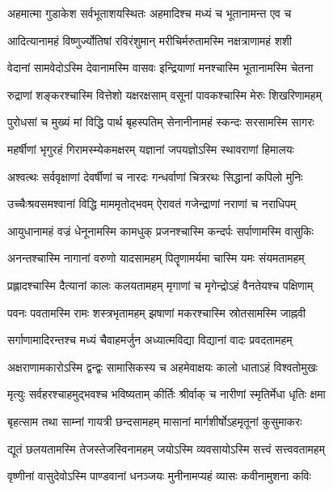 \twolineshloka
{अहमात्मा गुडाकेश सर्वभूताशयस्थितः}
{अहमादिश्च मध्यं च भूतानामन्त एव च}%

\twolineshloka
{आदित्यानामहं विष्णुर्ज्योतिषां रविरंशुमान्}
{मरीचिर्मरुतामस्मि नक्षत्राणामहं शशी}%

\twolineshloka
{वेदानां सामवेदोऽस्मि देवानामस्मि वासवः}
{इन्द्रियाणां मनश्चास्मि भूतानामस्मि चेतना}%

\twolineshloka
{रुद्राणां शङ्करश्चास्मि वित्तेशो यक्षरक्षसाम्}
{वसूनां पावकश्चास्मि मेरुः शिखरिणामहम्}%

\twolineshloka
{पुरोधसां च मुख्यं मां विद्धि पार्थ बृहस्पतिम्}
{सेनानीनामहं स्कन्दः सरसामस्मि सागरः}%

\twolineshloka
{महर्षीणां भृगुरहं गिरामस्म्येकमक्षरम्}
{यज्ञानां जपयज्ञोऽस्मि स्थावराणां हिमालयः}%

\twolineshloka
{अश्वत्थः सर्ववृक्षाणां देवर्षीणां च नारदः}
{गन्धर्वाणां चित्ररथः सिद्धानां कपिलो मुनिः}%

\twolineshloka
{उच्चैःश्रवसमश्वानां विद्धि माममृतोद्भवम्}
{ऐरावतं गजेन्द्राणां नराणां च नराधिपम्}%

\twolineshloka
{आयुधानामहं वज्रं धेनूनामस्मि कामधुक्}
{प्रजनश्चास्मि कन्दर्पः सर्पाणामस्मि वासुकिः}%

\twolineshloka
{अनन्तश्चास्मि नागानां वरुणो यादसामहम्}
{पितॄणामर्यमा चास्मि यमः संयमतामहम्}%

\twolineshloka
{प्रह्लादश्चास्मि दैत्यानां कालः कलयतामहम्}
{मृगाणां च मृगेन्द्रोऽहं वैनतेयश्च पक्षिणाम्}%

\twolineshloka
{पवनः पवतामस्मि रामः शस्त्रभृतामहम्}
{झषाणां मकरश्चास्मि स्रोतसामस्मि जाह्नवी}%

\twolineshloka
{सर्गाणामादिरन्तश्च मध्यं चैवाहमर्जुन}
{अध्यात्मविद्या विद्यानां वादः प्रवदतामहम्}%

\twolineshloka
{अक्षराणामकारोऽस्मि द्वन्द्वः सामासिकस्य च}
{अहमेवाक्षयः कालो धाताऽहं विश्वतोमुखः}%

\twolineshloka
{मृत्युः सर्वहरश्चाहमुद्भवश्च भविष्यताम्}
{कीर्तिः श्रीर्वाक् च नारीणां स्मृतिर्मेधा धृतिः क्षमा}%

\twolineshloka
{बृहत्साम तथा साम्नां गायत्री छन्दसामहम्}
{मासानां मार्गशीर्षोऽहमृतूनां कुसुमाकरः}%

\twolineshloka
{द्यूतं छलयतामस्मि तेजस्तेजस्विनामहम्}
{जयोऽस्मि व्यवसायोऽस्मि सत्त्वं सत्त्ववतामहम्}%

\twolineshloka
{वृष्णीनां वासुदेवोऽस्मि पाण्डवानां धनञ्जयः}
{मुनीनामप्यहं व्यासः कवीनामुशना कविः}%

